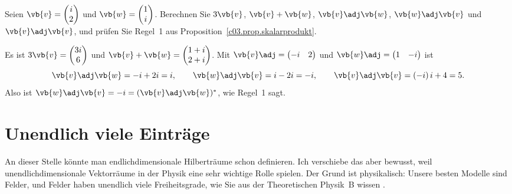 \begin{exercise}\label{c03.exc.rechnen}
  Seien $\vb{v} = \begin{pmatrix} i \\ 2 \end{pmatrix}$ und
  $\vb{w} = \begin{pmatrix} 1 \\ i \end{pmatrix}$. Berechnen Sie $3\vb{v}$,
  $\vb{v} + \vb{w}$, $\vb{v}\adj\vb{w}$, $\vb{w}\adj\vb{v}$ und $\vb{v}\adj\vb{v}$, und prüfen
  Sie Regel~1 aus Proposition~\ref{c03.prop.skalarprodukt}.
\end{exercise}
\begin{solution}
  Es ist $3\vb{v} = \begin{pmatrix} 3i \\ 6 \end{pmatrix}$ und
  $\vb{v} + \vb{w} = \begin{pmatrix} 1+i \\ 2+i \end{pmatrix}$. Mit
  $\vb{v}\adj = \begin{pmatrix} -i & 2 \end{pmatrix}$ und
  $\vb{w}\adj = \begin{pmatrix} 1 & -i \end{pmatrix}$ ist
  \begin{equation}\label{c03.eq.rechnen}
    \vb{v}\adj\vb{w} = -i + 2i = i,
    \qquad
    \vb{w}\adj\vb{v} = i - 2i = -i,
    \qquad
    \vb{v}\adj\vb{v} = (-i)\,i + 4 = 5 .
  \end{equation}
  Also ist $\vb{w}\adj\vb{v} = -i = (\vb{v}\adj\vb{w})^*$, wie Regel~1 sagt.
\end{solution}

\section{Unendlich viele Einträge}\label{c03.s3}

An dieser Stelle könnte man endlichdimensionale Hilberträume schon definieren. Ich verschiebe
das aber bewusst, weil unendlichdimensionale Vektorräume in der Physik eine sehr wichtige
Rolle spielen. Der Grund ist physikalisch: Unsere besten Modelle sind Felder, und Felder
haben unendlich viele Freiheitsgrade, wie Sie aus der Theoretischen Physik~B wissen
.

